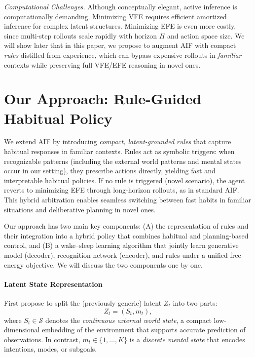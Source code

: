 \documentclass{article} %
\begin{document}
{\it Computational Challenges.} Although conceptually elegant, active inference is computationally demanding.  
Minimizing VFE requires efficient amortized inference for complex latent structures.  
Minimizing EFE is even more costly, since multi-step rollouts scale rapidly with horizon $H$ and action space size.  
We will show later that in this paper, we propose to augment AIF with compact \emph{rules} distilled from experience, which can bypass expensive rollouts in {\it familiar} contexts while preserving full VFE/EFE reasoning in novel ones.  

\section{Our Approach: Rule-Guided Habitual Policy}
\label{sec:method}
We extend AIF by introducing \emph{compact, latent-grounded rules} that capture habitual responses in familiar contexts.  
Rules act as symbolic triggers: when recognizable patterns (including the external world patterns and mental states occur in our setting), they prescribe actions directly, yielding fast and interpretable habitual policies.  
If no rule is triggered (novel scenario), the agent reverts to minimizing EFE through long-horizon rollouts, as in standard AIF.  
This hybrid arbitration enables seamless switching between fast habits in familiar situations and deliberative planning in novel ones.  

Our approach has two main key components: 
(A) the representation of rules and their integration into a hybrid policy that combines habitual and planning-based control, and 
(B) a wake--sleep learning algorithm that jointly learn 
generative model (decoder), recognition network (encoder), and rules under a unified free-energy objective. We will discuss the two components one by one. 

\paragraph{Latent State Representation} First propose to split the (previously generic) latent \(Z_t\) into two parts:
\[
Z_t = (S_t, m_t),
\]
where \(S_t\in\mathcal S\) denotes the \emph{continuous external world state}, a compact low-dimensional embedding of the environment that supports accurate prediction of observations.  
In contrast, \(m_t \in \{1,\dots,K\}\) is a \emph{discrete mental state} that encodes intentions, modes, or subgoals.  
\end{document}
